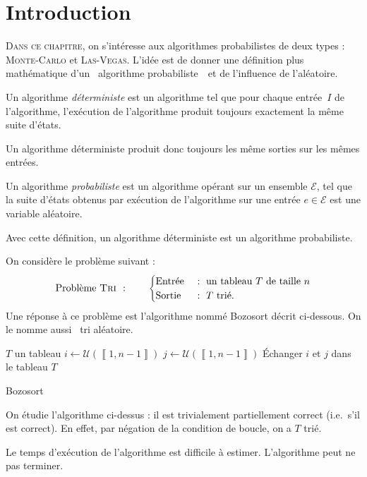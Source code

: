 \section{Introduction}

\lettrine{D}{ans ce chapitre}, on s'intéresse aux algorithmes probabilistes de deux types : \textsc{Monte-Carlo} et \textsc{Las-Vegas}.
L'idée est de donner une définition plus mathématique d'un \guillemotleft~algorithme probabiliste~\guillemotright\ et de l'influence de l'aléatoire.

\begin{defn}
	Un algorithme {\it déterministe}\/ est un algorithme tel que pour chaque entrée~$I$\/ de l'algorithme, l'exécution de l'algorithme produit toujours exactement la même suite d'états.
\end{defn}

\begin{rmk}
	Un algorithme déterministe produit donc toujours les même sorties sur les mêmes entrées.
\end{rmk}

\begin{defn}
	Un algorithme {\it probabiliste}\/ est un algorithme opérant sur un ensemble $\mathcal{E}$, tel que la suite d'états obtenus par exécution de l'algorithme sur une entrée $e \in \mathcal{E}$\/ est une variable aléatoire.
\end{defn}

\begin{rmk}
	Avec cette définition, un algorithme déterministe est un algorithme probabiliste.
\end{rmk}

\begin{exm}
	On considère le problème suivant : \[
		\text{Problème {\sc Tri }}:\qquad \begin{cases}
			\text{Entrée } &: \text{ un tableau } T \text{ de taille } n\\
			\text{Sortie } &:\ T \text{ trié}.
		\end{cases}
	\]
	Une réponse à ce problème est l'algorithme nommé {\sc Bozosort}\/ décrit ci-dessous. On le nomme aussi \guillemotleft~tri aléatoire.~\guillemotright
	\begin{algorithm}[H]
		\centering
		\begin{algorithmic}[1]
			\Entree $T$\/ un tableau
				\State $i \gets \mathcal{U}(\left\llbracket 1,n-1 \right\rrbracket)$
				\State $j \gets \mathcal{U}(\left\llbracket 1,n-1 \right\rrbracket)$
				\State Échanger $i$\/ et $j$\/ dans le tableau $T$\/
			\EndWhile
		\end{algorithmic}
		\caption{{\sc Bozosort}}
	\end{algorithm}
	On étudie l'algorithme ci-dessus : il est trivialement partiellement correct (i.e.\ s'il est correct). En effet, par négation de la condition de boucle, on a $T$\/ trié.

	Le temps d'exécution de l'algorithme est difficile à estimer. L'algorithme peut ne pas terminer.
\end{exm}

